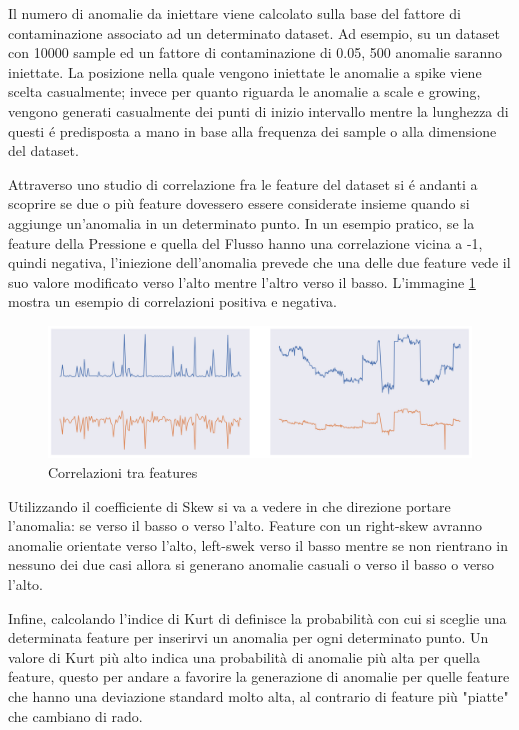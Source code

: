 Il numero di anomalie da iniettare viene calcolato sulla base del fattore di contaminazione associato ad un determinato dataset. Ad esempio, su un dataset con 10000 sample ed un fattore di contaminazione di 0.05, 500 anomalie saranno iniettate.
La posizione nella quale vengono iniettate le anomalie a spike viene scelta casualmente; invece per quanto riguarda le anomalie a scale e growing, vengono generati casualmente dei punti di inizio intervallo mentre la lunghezza di questi é predisposta a mano in base alla frequenza dei sample o alla dimensione del dataset.

Attraverso uno studio di correlazione fra le feature del dataset si é andanti a scoprire se due o più feature dovessero essere considerate insieme quando si aggiunge un'anomalia in un determinato punto. In un esempio pratico, se la feature della Pressione e quella del Flusso hanno una correlazione vicina a -1, quindi negativa, l'iniezione dell'anomalia prevede che una delle due feature vede il suo valore modificato verso l'alto mentre l'altro verso il basso. L'immagine \ref{feature-correlazioni} mostra un esempio di correlazioni positiva e negativa.
\begin{figure}[t]
	\centering
	\includegraphics[width=14cm, scale=1]{images/corr}
	\caption{Correlazioni tra features}
	\label{feature-correlazioni}
		
\end{figure}

Utilizzando il coefficiente di Skew si va a vedere in che direzione portare l'anomalia: se verso il basso o verso l'alto. Feature con un right-skew avranno anomalie orientate verso l'alto, left-swek verso il basso mentre se non rientrano in nessuno dei due casi allora si generano anomalie casuali o verso il basso o verso l'alto.

Infine, calcolando l'indice di Kurt di definisce la probabilità con cui si sceglie una determinata feature per inserirvi un anomalia per ogni determinato punto. Un valore di Kurt più alto indica una probabilità di anomalie più alta per quella feature, questo per andare a favorire la generazione di anomalie per quelle feature che hanno una deviazione standard molto alta, al contrario di feature più "piatte" che cambiano di rado.


